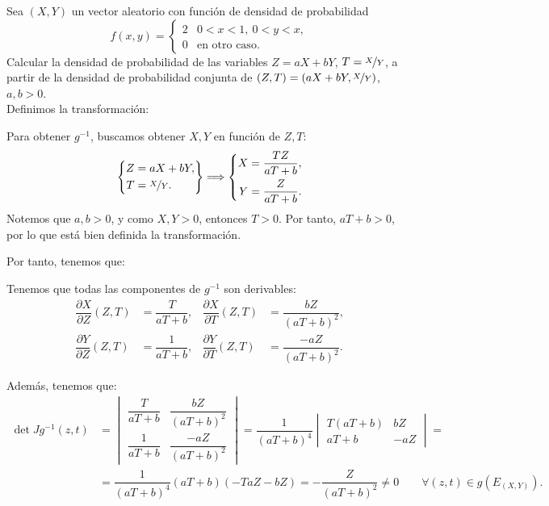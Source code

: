 \begin{ejercicio}
    Sea $(X,Y)$ un vector aleatorio con función de densidad de probabilidad
    \begin{equation*}
        f(x, y) = \begin{cases}
            2 & 0<x<1,~0<y<x, \\
            0 & \text{en otro caso}.
        \end{cases}
    \end{equation*}
    Calcular la densidad de probabilidad de las variables $Z=aX+bY$, $T=\nicefrac{X}{Y}$, a partir de la densidad de probabilidad conjunta de $(Z,T)=(aX+bY,\nicefrac{X}{Y})$, $a,b>0$.\\

    Definimos la transformación:

    Para obtener $g^{-1}$, buscamos obtener $X,Y$ en función de $Z,T$:
    \begin{equation*}
        \left\{\begin{aligned}
            Z&=aX+bY, \\
            T&=\nicefrac{X}{Y}.
        \end{aligned}\right\}\Longrightarrow
        \left\{\begin{aligned}
            X&=\dfrac{TZ}{aT+b}, \\
            Y&=\dfrac{Z}{aT+b}.
        \end{aligned}\right.
    \end{equation*}
    Notemos que $a,b>0$, y como $X,Y>0$, entonces $T>0$. Por tanto, $aT+b>0$, por lo que está bien definida la transformación.

    Por tanto, tenemos que:

    Tenemos que todas las componentes de $g^{-1}$ son derivables:
    \begin{align*}
        \dfrac{\partial X}{\partial Z}(Z,T)&=\dfrac{T}{aT+b}, & \dfrac{\partial X}{\partial T}(Z,T)&=\dfrac{bZ}{(aT+b)^2},\\
        \dfrac{\partial Y}{\partial Z}(Z,T)&=\dfrac{1}{aT+b}, & \dfrac{\partial Y}{\partial T}(Z,T)&=\dfrac{-aZ}{(aT+b)^2}.
    \end{align*}

    Además, tenemos que:
    \begin{align*}
        \det Jg^{-1}(z,t)&=\begin{vmatrix}
            \dfrac{T}{aT+b} & \dfrac{bZ}{(aT+b)^2} \\
            \dfrac{1}{aT+b} & \dfrac{-aZ}{(aT+b)^2}
        \end{vmatrix}=\dfrac{1}{(aT+b)^4}\begin{vmatrix}
            T(aT+b) & bZ \\
            aT+b & -aZ
        \end{vmatrix}
        =\\&=\dfrac{1}{(aT+b)^4}(aT+b)(-TaZ -bZ)
        = -\dfrac{Z}{(aT+b)^2}\neq 0 \qquad \forall (z,t)\in g(E_{(X,Y)}).
    \end{align*}


\end{ejercicio}
